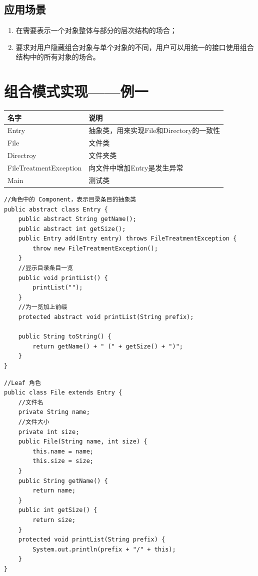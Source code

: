 \subsection{应用场景}
\begin{enumerate}
	\item 在需要表示一个对象整体与部分的层次结构的场合；
	\item 要求对用户隐藏组合对象与单个对象的不同，用户可以用统一的接口使用组合结构中的所有对象的场合。
\end{enumerate}
\section{组合模式实现——例一}
\begin{table}[!h]
	\begin{tabular}{|l|l|}
		\hline
		名字&说明\\
		\hline
		Entry&抽象类，用来实现File和Directory的一致性\\
		\hline
		File&文件类\\
		\hline
		Directroy&文件夹类\\
		\hline
		FileTreatmentException&向文件中增加Entry是发生异常\\
		\hline
		Main&测试类\\
		\hline
	\end{tabular}
\end{table}
\begin{lstlisting}
//角色中的 Component，表示目录条目的抽象类
public abstract class Entry {
	public abstract String getName();
	public abstract int getSize();
	public Entry add(Entry entry) throws FileTreatmentException {
		throw new FileTreatmentException();
	}
	//显示目录条目一览
	public void printList() {
		printList("");
	}
	//为一览加上前缀
	protected abstract void printList(String prefix);
	
	public String toString() {
		return getName() + " (" + getSize() + ")";
	}
}
\end{lstlisting}
\begin{lstlisting}
//Leaf 角色
public class File extends Entry {
	//文件名
	private String name;
	//文件大小
	private int size;
	public File(String name, int size) {
		this.name = name;
		this.size = size;
	}
	public String getName() {
		return name;
	}
	public int getSize() {
		return size;
	}
	protected void printList(String prefix) {
		System.out.println(prefix + "/" + this);
	}
}
\end{lstlisting}
